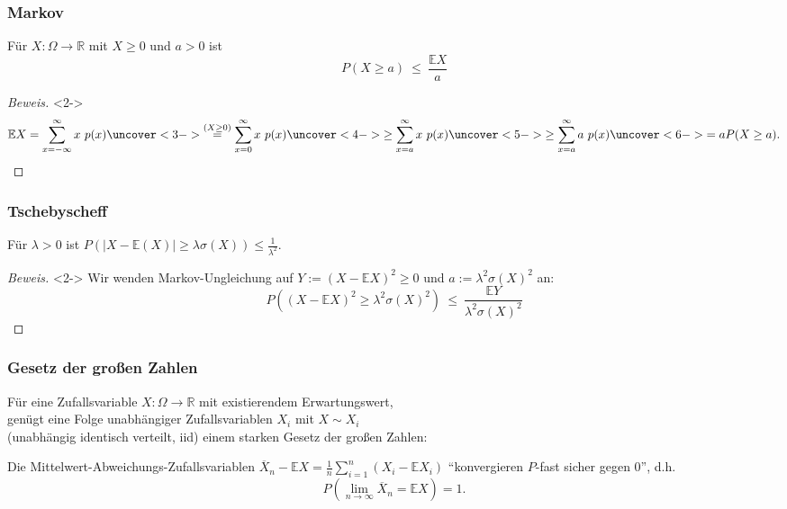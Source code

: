        \begin{frame}
    \frametitle{Markov}
    \begin{lemma}
      Für $X \colon \Omega \to \mathbb{R}$ mit $X \geq 0$ und $a > 0$ ist
 \[P(X \geq a) \ \leq\ \frac{\mathbb{E} X}{a}\]
\end{lemma}
\begin{proof}[Beweis]<2->
  \[\mathbb{E}X = \sum_{x=-\infty}^{\infty} x\ p(x) \uncover<3->{\overset{(X \geq 0)}{=}  \sum_{x=0}^{\infty} x\ p(x)} \uncover<4->{ \geq \sum_{x=a}^\infty x\ p(x)} \uncover<5->{\geq \sum_{x=a}^\infty a\ p(x)} \uncover<6->{= aP(X\geq a).}\]
\end{proof}
\end{frame} 

       \begin{frame}
    \frametitle{Tschebyscheff}
    \begin{lemma}
 Für $\lambda > 0$ ist
 $P\left(\left|X - \mathbb{E}(X)\right| \geq \lambda \sigma(X)\right) \leq \frac{1}{\lambda^2}$.
\end{lemma}
\begin{proof}[Beweis]<2-> Wir wenden Markov-Ungleichung auf $Y := {\left(X - \mathbb{E}X\right)}^2 \geq 0$ und $a := \lambda^2 \sigma(X)^2$ an:
  \[P\left({\left(X - \mathbb{E}X\right)}^2 \geq \lambda^2 \sigma(X)^2\right) \ \leq\ \frac{\mathbb{E} Y}{\lambda^2 \sigma(X)^2}\]
  
  \end{proof}
\end{frame}

   \begin{frame}
    \frametitle{Gesetz der großen Zahlen}
    Für eine Zufallsvariable $X \colon \Omega \to \mathbb{R}$ mit existierendem Erwartungswert,\\
    genügt eine Folge unabhängiger Zufallsvariablen $X_i$ mit $X \sim X_i$\\
    (\alert{unabhängig identisch verteilt, iid}) einem \alert{starken Gesetz der großen Zahlen}:

    Die Mittelwert-Abweichungs-Zufallsvariablen $\overline{X}_n - \mathbb{E}X  = \frac{1}{n} \sum_{i=1}^n (X_i - \mathbb{E}X_i)$ ``konvergieren $P$-fast sicher gegen $0$'', d.h.
    \[P\left(\lim_{n\to \infty} \overline{X}_n = \mathbb{E}X\right) = 1.\]
    \end{frame}

